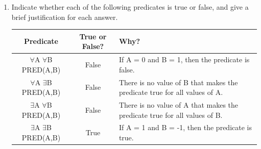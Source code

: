 \documentclass{article}
\begin{document}
\begin{enumerate}
    \newpage
    \item Indicate whether each of the following predicates is true or false, 
    and give a brief justification for each answer.
    
    \begin{tabular}{ |c|c|p{60mm}| }
        \hline
        Predicate                       & True or False? & Why?\\
        \hline
        $\forall$A $\forall$B PRED(A,B) & False          & If A = 0 and B = 1, then the predicate is false.\\
        \hline
        $\forall$A $\exists$B PRED(A,B) & False          & There is no value of B that makes the predicate true for all values of A.\\
        \hline
        $\exists$A $\forall$B PRED(A,B) & False          & There is no value of A that makes the predicate true for all values of B.\\
        \hline
        $\exists$A $\exists$B PRED(A,B) & True           & If A = 1 and B = -1, then the predicate is true.\\
        \hline
    \end{tabular}

\end{enumerate}
\end{document}
